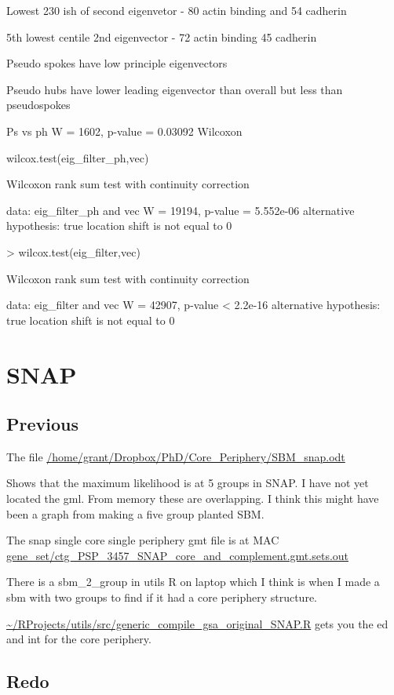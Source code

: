 Lowest 230 ish of second eigenvetor - 80 actin binding and 54 cadherin

5th lowest centile 2nd eigenvector - 72 actin binding 45 cadherin

Pseudo spokes have low principle eigenvectors

Pseudo hubs have lower leading eigenvector than overall but less than pseudospokes

Ps vs ph
W = 1602, p-value = 0.03092
Wilcoxon

wilcox.test(eig\_filter\_ph,vec)

        Wilcoxon rank sum test with continuity correction

data:  eig\_filter\_ph and vec
W = 19194, p-value = 5.552e-06
alternative hypothesis: true location shift is not equal to 0

> wilcox.test(eig\_filter,vec)

        Wilcoxon rank sum test with continuity correction

data:  eig\_filter and vec
W = 42907, p-value < 2.2e-16
alternative hypothesis: true location shift is not equal to 0
\section{SNAP}

\subsection{Previous}
The file \url{/home/grant/Dropbox/PhD/Core\_Periphery/SBM\_snap.odt}

Shows that the maximum likelihood is at 5 groups in SNAP. I have not yet located the gml. From memory these are overlapping. I think this might have been a graph from making a five group planted SBM.

The snap single core single periphery gmt file is at MAC \url{ gene\_set/ctg\_PSP\_3457\_SNAP\_core\_and\_complement.gmt.sets.out}

There is a sbm\_2\_group in utils R on laptop which I think is when I made a sbm with two groups to find if it had a core periphery structure.

\url{~/RProjects/utils/src/generic_compile_gsa_original_SNAP.R} gets you the ed and int for the core periphery.

\subsection{Redo}

